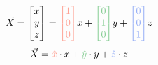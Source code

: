 \documentclass[preview]{standalone}
\begin{document}
$$\vec{X} = \begin{bmatrix}x\\y\\z\end{bmatrix} = \textcolor[HTML]{fea294}{\begin{bmatrix}1\\0\\0\end{bmatrix}} x + \textcolor[HTML]{81cb8f}{\begin{bmatrix}0\\1\\0\end{bmatrix}} y + \textcolor[HTML]{91abf6}{\begin{bmatrix}0\\0\\1\end{bmatrix}} z$$
$$\vec{X} = \textcolor[HTML]{fea294}{\hat{x}}\cdot x + \textcolor[HTML]{81cb8f}{\hat{y}}\cdot y + \textcolor[HTML]{91abf6}{\hat{z}}\cdot z$$
\end{document}
